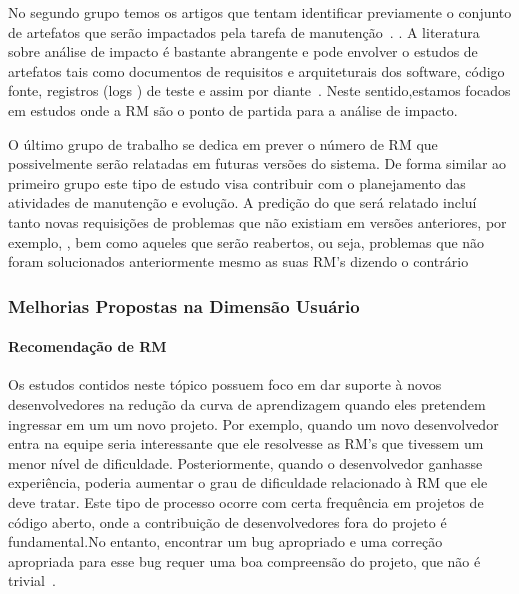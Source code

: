 No segundo grupo temos os artigos que tentam identificar previamente o conjunto
de artefatos que serão impactados pela tarefa de manutenção~\cite{Nagwani2010}.
. A literatura sobre análise de
impacto é bastante abrangente e pode envolver o estudos de artefatos tais como
documentos de requisitos e arquiteturais dos software, código fonte, registros
(logs ) de teste e assim por diante~\cite{cavalcanti2014challenges}. Neste
sentido,estamos focados em estudos onde a RM são o ponto de partida para a
análise de impacto.

O último grupo de trabalho se dedica em prever o número de RM que possivelmente
serão relatadas em futuras versões do sistema. De forma similar ao primeiro
grupo este tipo de estudo visa contribuir com o planejamento das atividades de
manutenção e evolução. A predição do que será relatado incluí tanto novas
requisições de problemas que não existiam em versões anteriores, por exemplo,
, bem
como aqueles que serão reabertos, ou seja, problemas que não foram solucionados
anteriormente mesmo as suas RM's dizendo o contrário~\cite{xia2015automatic}

\subsubsection{Melhorias Propostas na Dimensão Usuário}
\label{ssub:melhorias_dim_usuario}

\paragraph{Recomendação de RM}
Os estudos contidos neste tópico possuem foco em dar suporte à novos
desenvolvedores na redução da curva de aprendizagem quando eles pretendem
ingressar em um um novo projeto. Por exemplo, quando um novo desenvolvedor entra
na equipe seria interessante que ele resolvesse as RM's que tivessem um menor
nível de dificuldade. Posteriormente, quando o desenvolvedor ganhasse
experiência, poderia aumentar o grau de dificuldade relacionado à RM que ele
deve tratar. Este tipo de processo ocorre com certa frequência em projetos de
código aberto, onde a contribuição de desenvolvedores fora do projeto é
fundamental.No entanto, encontrar um bug apropriado e uma correção apropriada
para esse bug requer uma boa compreensão do projeto, que não é
trivial~\cite{Wang2011bug}.

